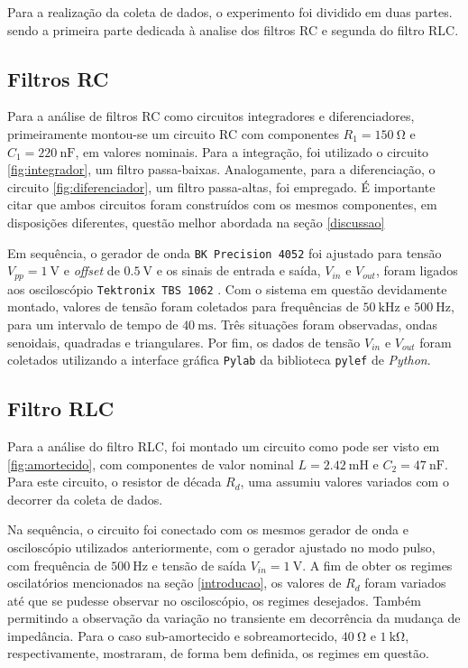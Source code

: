 Para a realização da coleta de dados, o experimento foi dividido em duas partes. sendo a primeira parte dedicada à analise dos filtros RC e segunda do filtro RLC.

\subsection{Filtros RC}

    Para a análise de filtros RC como circuitos integradores e diferenciadores, primeiramente montou-se um circuito RC com componentes $R_1=\SI{150}{\ohm}$ e $C_1=\SI{220}{\nano\farad}$, em valores nominais. Para a integração, foi utilizado o circuito \ref{fig:integrador}, um filtro passa-baixas. Analogamente, para a diferenciação, o circuito \ref{fig:diferenciador}, um filtro passa-altas, foi empregado. É importante citar que ambos circuitos foram construídos com os mesmos componentes, em disposições diferentes, questão melhor abordada na seção \ref{discussao}
    
    Em sequência, o gerador de onda \texttt{BK Precision 4052} \cite{ref:gerador} foi ajustado para tensão $V_{pp}=\SI{1}{\volt}$ e \textit{offset} de $\SI{0,5}{\volt}$ e os sinais de entrada e saída, $V_{in}$ e $V_{out}$, foram ligados aos osciloscópio \texttt{Tektronix TBS 1062} \cite{ref:osciloscopio}. Com o sistema em questão devidamente montado, valores de tensão foram coletados para frequências de $\SI{50}{\kilo\hertz}$ e $\SI{500}{\hertz}$, para um intervalo de tempo de $\SI{40}{\milli\second}$. Três situações foram observadas, ondas senoidais, quadradas e triangulares. Por fim, os dados de tensão $V_{in}$ e $V_{out}$ foram coletados utilizando a interface gráfica \texttt{Pylab} da biblioteca  \texttt{pylef}\cite{ref:pylef} de \textit{Python}.

\subsection{Filtro RLC}

    Para a análise do filtro RLC, foi montado um circuito como pode ser visto em \ref{fig:amortecido}, com componentes de valor nominal $L=\SI{2,42}{\milli\henry}$ e $C_{2}=\SI{47}{\nano\farad}$. Para este circuito, o resistor de década $R_{d}$, uma assumiu valores variados com o decorrer da coleta de dados.
    
    Na sequência, o circuito foi conectado com os mesmos gerador de onda e osciloscópio utilizados anteriormente, com o gerador ajustado no modo pulso, com frequência de $\SI{500}{\hertz}$ e tensão de saída $V_{in}=\SI{1}{\volt}$. A fim de obter os regimes oscilatórios mencionados na seção \ref{introducao}, os valores de $R_d$ foram variados até que se pudesse observar no osciloscópio, os regimes desejados. Também permitindo a observação da variação no transiente em decorrência da mudança de impedância. Para o caso sub-amortecido e sobreamortecido, $\SI{40}{\ohm}$ e $\SI{1}{\kilo\ohm}$, respectivamente, mostraram, de forma bem definida, os regimes em questão. 
    
